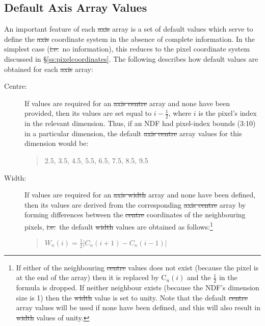\subsection{\label{ss:axisdefaults}Default Axis Array Values}

An important feature of each \st{axis\/} array is a set of default values
which serve to define the \st{axis\/} coordinate system in the absence of
complete information. 
In the simplest case (\st{i.e.}\ no information), this reduces to the pixel
coordinate system discussed in \S\ref{ss:pixelcoordinates}. 
The following describes how default values are obtained for each \st{axis\/} array: 

\begin{description}

\item[Centre:]
If values are required for an \st{axis centre\/} array and none have been
provided, then its values are set equal to $i-\frac{1}{2}$, where $i$ is the
pixel's index in the relevant dimension. 
Thus, if an NDF had pixel-index bounds (3:10) in a particular dimension, the
default \st{axis centre\/} array values for this dimension would be:

\small
\begin{quote}
\begin{center}
2.5, 3.5, 4.5, 5.5, 6.5, 7.5, 8.5, 9.5
\end{center}
\end{quote}
\normalsize

\item[Width:]
If values are required for an \st{axis width\/} array and none have been
defined, then its values are derived from the corresponding \st{axis
centre\/} array by forming differences between the \st{centre\/}
coordinates of the neighbouring pixels, \st{i.e.}\ the default \st{
width\/} values are obtained as follows:\footnote{If either of the
neighbouring \st{centre\/} values does not exist (because the pixel is at
the end of the array) then it is replaced by C$_{n}(i)$ and the
$\frac{1}{2}$ in the formula is dropped. If neither neighbour exists
(because the NDF's dimension size is 1) then the \st{width\/} value is set
to unity. 
Note that the default \st{centre\/} array values will be used if none have
been defined, and this will also result in \st{width\/} values of unity.} 

\small
\begin{quote}
\begin{center}
$W_{n}(i) = \frac{1}{2} |C_n(i+1) - C_{n}(i-1)|$
\end{center}
\end{quote}
\normalsize


\end{description}

